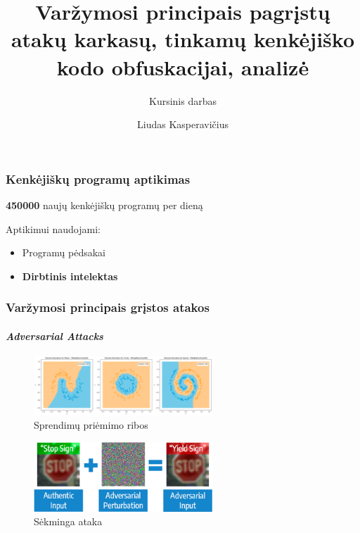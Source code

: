 \documentclass[12pt]{beamer}
\title[]{Varžymosi principais pagrįstų atakų karkasų, tinkamų kenkėjiško kodo obfuskacijai, analizė}
\subtitle[]{Kursinis darbas}
\author[Liudas Kasperavičius]{Liudas Kasperavičius}
\date{}
\begin{document}
\begin{frame}
    \titlepage
\end{frame}

\begin{frame}
    \frametitle{Kenkėjiškų programų aptikimas}
    \begin{center}
        \huge\textbf{450000} naujų kenkėjiškų programų per dieną \large{\cite{MalwareStatisticsTrendsa}}
    \end{center}\pause

    \vspace{40pt}
    Aptikimui naudojami:
    \begin{itemize}
        \item Programų pėdsakai\pause
        \item \textbf{Dirbtinis intelektas}
    \end{itemize}
\end{frame}

\begin{frame}
    \frametitle{Varžymosi principais grįstos atakos}
    \framesubtitle{\textit{Adversarial Attacks}}
    \begin{figure}
        \begin{small}
            \begin{center}
                \includegraphics[width=0.60\textwidth]{resources/decision_boundaries.png}
            \end{center}
            \caption{Sprendimų priėmimo ribos \cite{VisualisingDecisionBoundaries}}
            \label{fig:decision_boundaries}
        \end{small}
    \end{figure}\pause

    \begin{figure}
        \begin{small}
            \begin{center}
                \includegraphics[width=0.60\textwidth]{resources/adversarial_example.png}
            \end{center}
            \caption{Sėkminga ataka \cite{AdversarialImagesAttacks}}
            \label{fig:adversarial_example}
        \end{small}
    \end{figure}
    
    
\end{frame}
\end{document}
